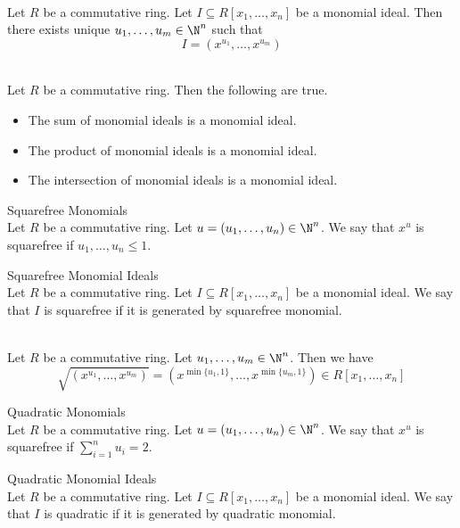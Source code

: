 \documentclass[a4paper]{article}
\begin{document}
\begin{prp}{}{}\\
Let $R$ be a commutative ring. Let $I\subseteq R[x_1,\dots,x_n]$ be a monomial ideal. Then there exists unique $u_1,\dots,u_m\in\N^n$ such that $$I=(x^{u_1},\dots,x^{u_m})$$
\end{prp}

\begin{prp}{}{}\\
Let $R$ be a commutative ring. Then the following are true. 
\begin{itemize}
\item The sum of monomial ideals is a monomial ideal. 
\item The product of monomial ideals is a monomial ideal. 
\item The intersection of monomial ideals is a monomial ideal. 
\end{itemize}
\end{prp}

\begin{defn}{Squarefree Monomials}{}\\
Let $R$ be a commutative ring. Let $u=(u_1,\dots,u_n)\in\N^n$. We say that $x^u$ is squarefree if $u_1,\dots,u_n\leq 1$. 
\end{defn}

\begin{defn}{Squarefree Monomial Ideals}{}\\
Let $R$ be a commutative ring. Let $I\subseteq R[x_1,\dots,x_n]$ be a monomial ideal. We say that $I$ is squarefree if it is generated by squarefree monomial. 
\end{defn}

\begin{prp}{}{}\\
Let $R$ be a commutative ring. Let $u_1,\dots,u_m\in\N^n$. Then we have $$\sqrt{(x^{u_1},\dots,x^{u_m})}=\left(x^{\min\{u_1,1\}},\dots,x^{\min\{u_m,1\}}\right)\in R[x_1,\dots,x_n]$$
\end{prp}

\begin{defn}{Quadratic Monomials}{}\\
Let $R$ be a commutative ring. Let $u=(u_1,\dots,u_n)\in\N^n$. We say that $x^u$ is squarefree if $\sum_{i=1}^nu_i=2$. 
\end{defn}

\begin{defn}{Quadratic Monomial Ideals}{}\\
Let $R$ be a commutative ring. Let $I\subseteq R[x_1,\dots,x_n]$ be a monomial ideal. We say that $I$ is quadratic if it is generated by quadratic monomial. 
\end{defn}
\end{document}
